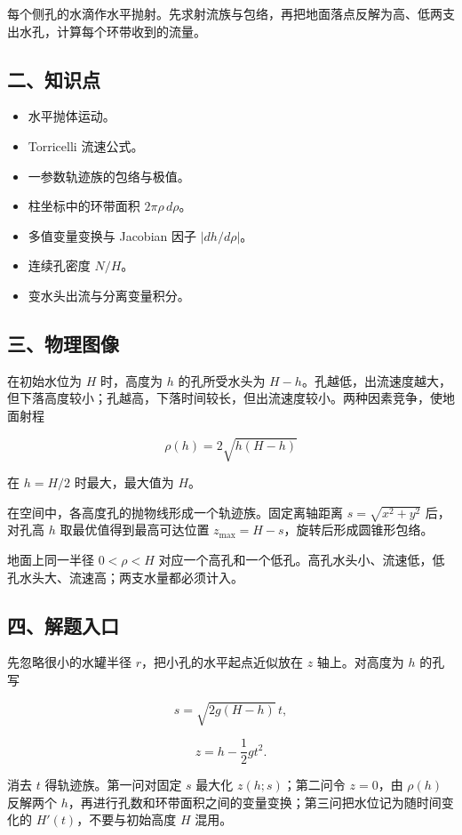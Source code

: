 \documentclass[12pt,a4paper,UTF8]{ctexart}
\newcommand{\tightlist}{\setlength{\itemsep}{0pt}\setlength{\parskip}{0pt}}
\begin{document}
每个侧孔的水滴作水平抛射。先求射流族与包络，再把地面落点反解为高、低两支出水孔，计算每个环带收到的流量。

\subsection{二、知识点}\label{ux4e8cux77e5ux8bc6ux70b9-7}

\begin{itemize}
\tightlist
\item
  水平抛体运动。
\item
  Torricelli 流速公式。
\item
  一参数轨迹族的包络与极值。
\item
  柱坐标中的环带面积 \(2\pi\rho\,d\rho\)。
\item
  多值变量变换与 Jacobian 因子 \(|dh/d\rho|\)。
\item
  连续孔密度 \(N/H\)。
\item
  变水头出流与分离变量积分。
\end{itemize}

\subsection{三、物理图像}\label{ux4e09ux7269ux7406ux56feux50cf-7}

在初始水位为 \(H\) 时，高度为 \(h\) 的孔所受水头为
\(H-h\)。孔越低，出流速度越大，但下落高度较小；孔越高，下落时间较长，但出流速度较小。两种因素竞争，使地面射程

\[\rho(h)=2\sqrt{h(H-h)}\]

在 \(h=H/2\) 时最大，最大值为 \(H\)。

在空间中，各高度孔的抛物线形成一个轨迹族。固定离轴距离
\(s=\sqrt{x^2+y^2}\) 后，对孔高 \(h\) 取最优值得到最高可达位置
\(z_{\max}=H-s\)，旋转后形成圆锥形包络。

地面上同一半径 \(0<\rho<H\)
对应一个高孔和一个低孔。高孔水头小、流速低，低孔水头大、流速高；两支水量都必须计入。

\subsection{四、解题入口}\label{ux56dbux89e3ux9898ux5165ux53e3-7}

先忽略很小的水罐半径 \(r\)，把小孔的水平起点近似放在 \(z\)
轴上。对高度为 \(h\) 的孔写

\[s=\sqrt{2g(H-h)}\,t,\]

\[z=h-\frac12gt^2.\]

消去 \(t\) 得轨迹族。第一问对固定 \(s\) 最大化 \(z(h;s)\)；第二问令
\(z=0\)，由 \(\rho(h)\) 反解两个
\(h\)，再进行孔数和环带面积之间的变量变换；第三问把水位记为随时间变化的
\(H'(t)\)，不要与初始高度 \(H\) 混用。
\end{document}
